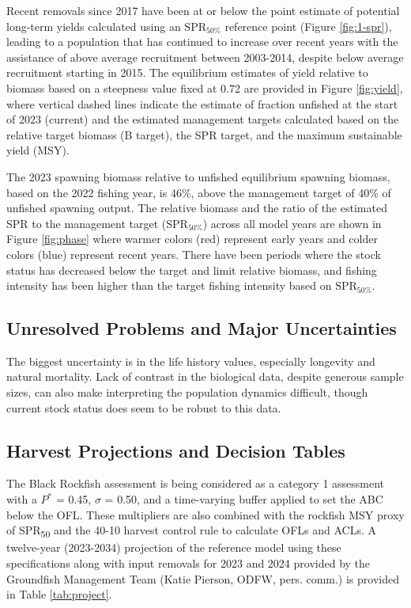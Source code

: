 \documentclass[11pt,
  english,
  letterpaper,
]{article}
\begin{document}
Recent removals since 2017 have been at or below the point estimate of potential long-term yields calculated using an \(\text{SPR}_{50\%}\) reference point (Figure \ref{fig:1-spr}), leading to a population that has continued to increase over recent years with the assistance of above average recruitment between 2003-2014, despite below average recruitment starting in 2015. The equilibrium estimates of yield relative to biomass based on a steepness value fixed at 0.72 are provided in Figure \ref{fig:yield}, where vertical dashed lines indicate the estimate of fraction unfished at the start of 2023 (current) and the estimated management targets calculated based on the relative target biomass (B target), the SPR target, and the maximum sustainable yield (MSY).

The 2023 spawning biomass relative to unfished equilibrium spawning biomass, based on the 2022 fishing year, is 46\%, above the management target of 40\% of unfished spawning output. The relative biomass and the ratio of the estimated SPR to the management target (\(\text{SPR}_{50\%}\)) across all model years are shown in Figure \ref{fig:phase} where warmer colors (red) represent early years and colder colors (blue) represent recent years. There have been periods where the stock status has decreased below the target and limit relative biomass, and fishing intensity has been higher than the target fishing intensity based on \(\text{SPR}_{50\%}\).

\hypertarget{unresolved-problems-and-major-uncertainties-2}{%
\subsection{Unresolved Problems and Major Uncertainties}\label{unresolved-problems-and-major-uncertainties-2}}

The biggest uncertainty is in the life history values, especially longevity and natural mortality. Lack of contrast in the biological data, despite generous sample sizes, can also make interpreting the population dynamics difficult, though current stock status does seem to be robust to this data.

\hypertarget{harvest-projections-and-decision-tables}{%
\subsection{Harvest Projections and Decision Tables}\label{harvest-projections-and-decision-tables}}

The Black Rockfish assessment is being considered as a category 1 assessment with a \(P^*\) = 0.45, \(\sigma\) = 0.50, and a time-varying buffer applied to set the ABC below the OFL. These multipliers are also combined with the rockfish MSY proxy of SPR\textsubscript{50} and the 40-10 harvest control rule to calculate OFLs and ACLs. A twelve-year (2023-2034) projection of the reference model using these specifications along with input removals for 2023 and 2024 provided by the Groundfish Management Team (Katie Pierson, ODFW, pers. comm.) is provided in Table \ref{tab:project}.
\end{document}
